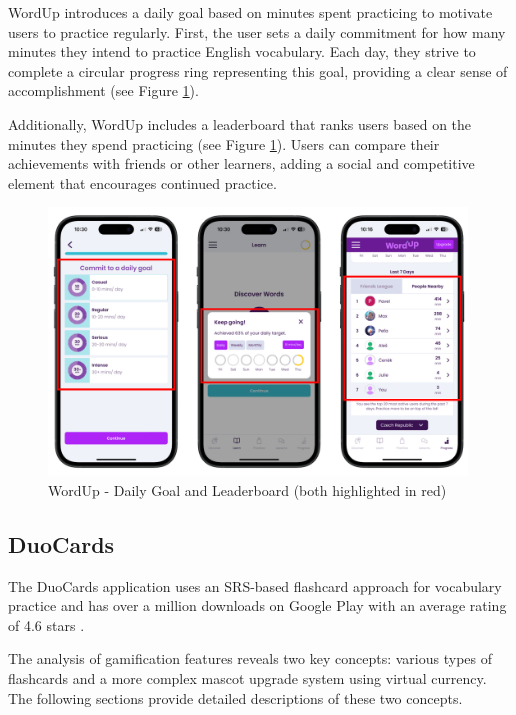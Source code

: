 \begin{itemize}
    WordUp introduces a daily goal based on minutes spent practicing to motivate users to practice regularly. First, the user sets a daily commitment for how many minutes they intend to practice English vocabulary. Each day, they strive to complete a circular progress ring representing this goal, providing a clear sense of accomplishment (see Figure \ref{fig:wordup-daily-goal}).
    
    Additionally, WordUp includes a leaderboard that ranks users based on the minutes they spend practicing (see Figure \ref{fig:wordup-daily-goal}). Users can compare their achievements with friends or other learners, adding a social and competitive element that encourages continued practice. 

    \begin{figure}[!h]
        \includegraphics[width=0.99\textwidth]{src/figures/wordup-daily-goal.png}
        \caption{WordUp - Daily Goal and Leaderboard (both highlighted in red)}
        \label{fig:wordup-daily-goal}
    \end{figure}

\end{itemize}

\subsection{DuoCards}

The DuoCards application uses an SRS-based flashcard approach for vocabulary practice and has over a million downloads on Google Play with an average rating of 4.6 stars \cite{cite:duocards_google_play}. 

The analysis of gamification features reveals two key concepts: various types of flashcards and a more complex mascot upgrade system using virtual currency. The following sections provide detailed descriptions of these two concepts.

